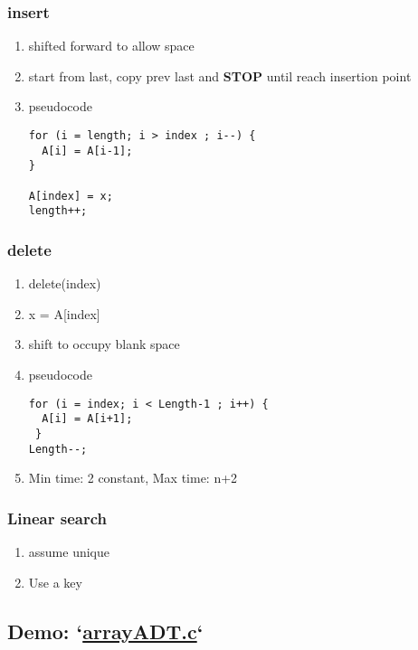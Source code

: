 \documentclass{article}
\begin{document}
\subsubsection{insert}
\label{sec:org4082ff3}
\begin{enumerate}
\item shifted forward to allow space
\label{sec:orgeb28a16}
\item start from last, copy prev last and \textbf{STOP} until reach insertion point
\label{sec:org4c2182c}
\item pseudocode
\label{sec:orge12f156}
\begin{verbatim}
for (i = length; i > index ; i--) {
  A[i] = A[i-1];
}

A[index] = x;
length++;

\end{verbatim}
\end{enumerate}
\subsubsection{delete}
\label{sec:orgfc818e0}
\begin{enumerate}
\item delete(index)
\label{sec:org78588db}
\item x = A[index]
\label{sec:org0fdbde4}
\item shift to occupy blank space
\label{sec:org6232956}
\item pseudocode
\label{sec:orgfeec43f}
\begin{verbatim}
for (i = index; i < Length-1 ; i++) {
  A[i] = A[i+1];
 }
Length--;
\end{verbatim}
\item Min time: 2 constant, Max time: n+2
\label{sec:org2a7b65f}
\end{enumerate}
\subsubsection{Linear search}
\label{sec:org80ee9c2}
\begin{enumerate}
\item assume unique
\label{sec:orgf7dcd67}
\item Use a key
\label{sec:orgfd238b0}
\end{enumerate}
\subsection{Demo: `\url{arrayADT.c}`}
\label{sec:org3eb825e}
\end{document}
